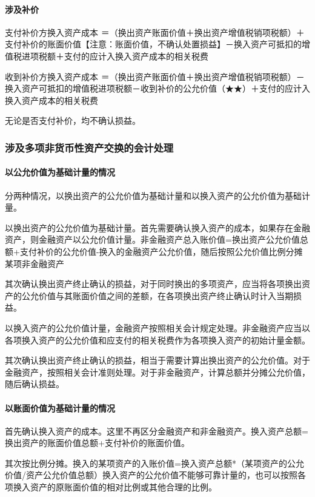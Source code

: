 \documentclass[UTF8,12pt]{ctexart}
\numberwithin{equation}{section} %
\numberwithin{figure}{section}
\numberwithin{table}{section}
\begin{document}
	
	\paragraph{涉及补价}
	支付补价方换入资产成本
	＝（换出资产账面价值＋换出资产增值税销项税额）＋支付补价的账面价值【注意：账面价值，不确认处置损益】－换入资产可抵扣的增值税进项税额＋支付的应计入换入资产成本的相关税费
	
	收到补价方换入资产成本
	＝（换出资产账面价值＋换出资产增值税销项税额）－换入资产可抵扣的增值税进项税额－收到补价的公允价值（★★）＋支付的应计入换入资产成本的相关税费
	
	无论是否支付补价，均不确认损益。
	
	
	\subsubsection{涉及多项非货币性资产交换的会计处理}
	\paragraph{以公允价值为基础计量的情况}
	分两种情况，以换出资产的公允价值为基础计量和以换入资产的公允价值为基础计量。
	
	以换出资产的公允价值为基础计量。首先需要确认换入资产的成本，如果存在金融资产，则金融资产以公允价值计量。非金融资产总入账价值=换出资产公允价值总额+支付补价的公允价值-换入的金融资产公允价值，随后按照公允价值比例分摊某项非金融资产
	
	其次确认换出资产终止确认的损益，对于同时换出的多项资产，应当将各项换出资产的公允价值与其账面价值之间的差额，在各项换出资产终止确认时计入当期损益。
	
	以换入资产的公允价值计量，金融资产按照相关会计规定处理。非金融资产应当以各项换入资产的公允价值和应支付的相关税费作为各项换入资产的初始计量金额。
	
	其次确认换出资产终止确认的损益，相当于需要计算出换出资产的公允价值。对于金融资产，按照相关会计准则处理。对于非金融资产，计算总额并分摊公允价值，随后确认损益。
	
	\paragraph{以账面价值为基础计量的情况}
	首先确认换入资产的成本。这里不再区分金融资产和非金融资产。换入资产总额=换出资产的账面价值总额+支付补价的账面价值。
	
	其次按比例分摊。换入的某项资产的入账价值=换入资产总额*（某项资产的公允价值/资产公允价值总额）换入资产的公允价值不能够可靠计量的，也可以按照各项换入资产的原账面价值的相对比例或其他合理的比例。
	
\end{document}
